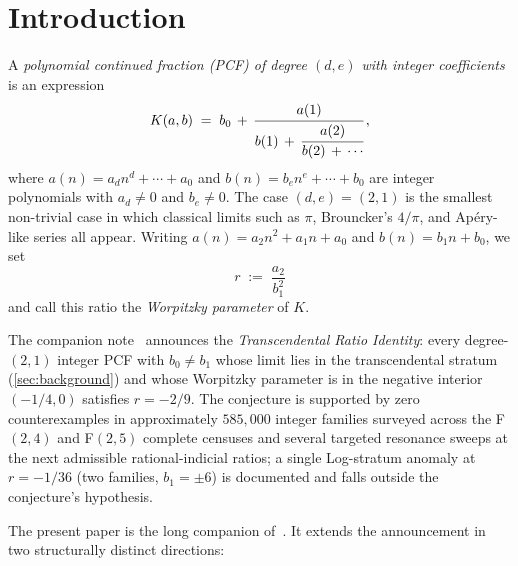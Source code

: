 \documentclass[11pt]{amsart}
\theoremstyle{definition}
\theoremstyle{remark}
\begin{document}
\maketitle

\section{Introduction}\label{sec:intro}

A \emph{polynomial continued fraction (PCF) of degree $(d,e)$ with
integer coefficients} is an expression
\begin{equation}\label{eq:pcf}
  K(a,b) \;=\; b_0 \,+\, \cfrac{a(1)}{b(1) \,+\, \cfrac{a(2)}{b(2)
  \,+\, \cdots}}\,,
\end{equation}
where $a(n) = a_d n^d + \cdots + a_0$ and $b(n) = b_e n^e + \cdots +
b_0$ are integer polynomials with $a_d \ne 0$ and $b_e \ne 0$.  The
case $(d,e) = (2,1)$ is the smallest non-trivial case in which
classical limits such as $\pi$, Brouncker's $4/\pi$, and Apéry-like
series all appear.  Writing $a(n) = a_2 n^2 + a_1 n + a_0$ and
$b(n) = b_1 n + b_0$, we set
\[
  r \;:=\; \frac{a_2}{b_1^2}
\]
and call this ratio the \emph{Worpitzky parameter} of $K$.

The companion note~\cite{TRINote} announces the \emph{Transcendental
Ratio Identity}: every degree-$(2,1)$ integer PCF with $b_0 \ne b_1$
whose limit lies in the transcendental stratum
(\textsection\ref{sec:background}) and whose Worpitzky parameter is
in the negative interior $(-1/4,0)$ satisfies $r=-2/9$.  The conjecture is supported by zero
counterexamples in approximately $585{,}000$ integer families surveyed
across the F$(2,4)$ and F$(2,5)$ complete censuses and several
targeted resonance sweeps at the next admissible rational-indicial
ratios; a single Log-stratum anomaly at $r=-1/36$ (two families,
$b_1=\pm 6$) is documented and falls outside the conjecture's hypothesis.

The present paper is the long companion of~\cite{TRINote}.  It
extends the announcement in two structurally distinct directions:
\end{document}
